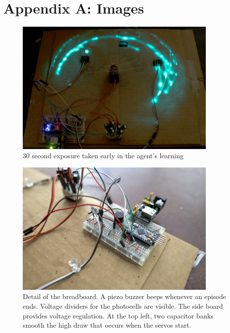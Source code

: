 \documentclass{article}
\begin{document}
	\clearpage
	
	
	\section{Appendix A: Images}
	
		\begin{figure}[!htb]
			\centering
			\includegraphics[width=10cm]{../photos/long_shutter_small.jpg}
			\caption{30 second exposure taken early in the agent's learning}
			\label{fig:long_shutter}
		\end{figure}
		
		\begin{figure}[!htb]
			\centering
			\includegraphics[width=10cm]{../photos/breadboard_small.jpg}
			\caption{Detail of the breadboard. A piezo buzzer beeps whenever an episode ends. Voltage dividers for the photocells are visible. The side board provides voltage regulation. At the top left, two capacitor banks smooth the high draw that occurs when the servos start. }
			\label{fig:breadboard}
		\end{figure}
		
\end{document}
